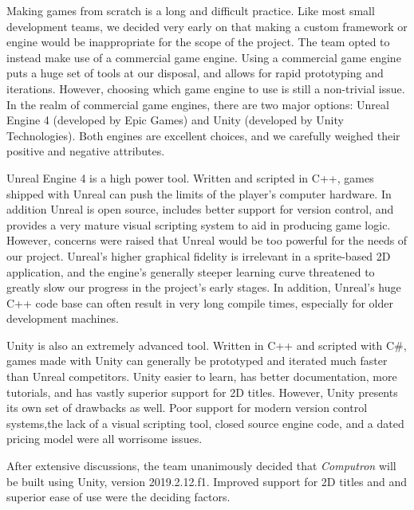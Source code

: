 Making games from scratch is a long and difficult practice. Like most small development teams, we decided very early on that making a custom framework or engine would be inappropriate for the scope of the project. The team opted to instead make use of a commercial game engine. Using a commercial game engine puts a huge set of tools at our disposal, and allows for rapid prototyping and iterations. However, choosing which game engine to use is still a non-trivial issue. In the realm of commercial game engines, there are two major options: Unreal Engine 4 (developed by Epic Games) and Unity (developed by Unity Technologies). Both engines are excellent choices, and we carefully weighed their positive and negative attributes. 

Unreal Engine 4 is a high power tool. Written and scripted in C++, games shipped with Unreal can push the limits of the player's computer hardware. In addition Unreal is open source, includes better support for version control, and provides a very mature visual scripting system to aid in producing game logic. However, concerns were raised that Unreal would be too powerful for the needs of our project. Unreal's higher graphical fidelity is irrelevant in a sprite-based 2D application, and the engine's generally steeper learning curve threatened to greatly slow our progress in the project's early stages. In addition, Unreal's huge C++ code base can often result in very long compile times, especially for older development machines.

Unity is also an extremely advanced tool. Written in C++ and scripted with C\#, games made with Unity can generally be prototyped and iterated much faster than Unreal competitors. Unity easier to learn, has better documentation, more tutorials, and has vastly superior support for 2D titles. However, Unity presents its own set of drawbacks as well. Poor support for modern version control systems,the lack of a visual scripting tool, closed source engine code, and a dated pricing model were all worrisome issues.

After extensive discussions, the team unanimously decided that \textit{Computron} will be built using Unity, version 2019.2.12.f1. Improved support for 2D titles and and superior ease of use were the deciding factors.



